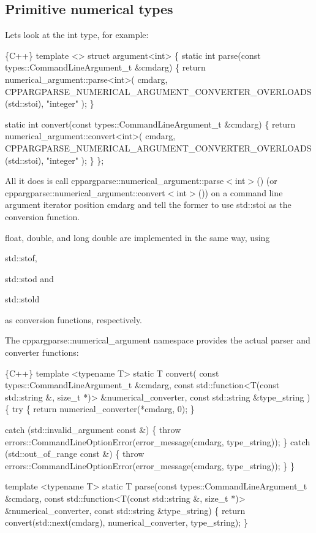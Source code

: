 \subsection*{Primitive numerical types}

Let\textquotesingle{}s look at the {\ttfamily int} type, for example\+: 
\begin{DoxyCode}
\{C++\}
template <>
struct argument<int>
\{
    static int parse(const types::CommandLineArgument\_t &cmdarg)
    \{
        return numerical\_argument::parse<int>(
            cmdarg,
            CPPARGPARSE\_NUMERICAL\_ARGUMENT\_CONVERTER\_OVERLOADS(std::stoi),
            "integer"
        );
    \}

    static int convert(const types::CommandLineArgument\_t &cmdarg)
    \{
        return numerical\_argument::convert<int>(
            cmdarg,
            CPPARGPARSE\_NUMERICAL\_ARGUMENT\_CONVERTER\_OVERLOADS(std::stoi),
            "integer"
        );
    \}
\};
\end{DoxyCode}


All it does is call {\ttfamily cppargparse\+::numerical\+\_\+argument\+::parse$<$int$>$()} (or {\ttfamily cppargparse\+::numerical\+\_\+argument\+::convert$<$int$>$()}) on a command line argument iterator position {\ttfamily cmdarg} and tell the former to use {\ttfamily std\+::stoi} as the conversion function.

{\ttfamily float}, {\ttfamily double}, and {\ttfamily long double} are implemented in the same way, using
\begin{DoxyItemize}
\item {\ttfamily std\+::stof},
\item {\ttfamily std\+::stod} and
\item {\ttfamily std\+::stold}
\end{DoxyItemize}

as conversion functions, respectively.

The {\ttfamily cppargparse\+::numerical\+\_\+argument} namespace provides the actual parser and converter functions\+: 
\begin{DoxyCode}
\{C++\}
template <typename T>
static T convert(
        const types::CommandLineArgument\_t &cmdarg,
        const std::function<T(const std::string &, size\_t *)> &numerical\_converter,
        const std::string &type\_string
    )
\{
    try
    \{
        return numerical\_converter(*cmdarg, 0);
    \}

    catch (std::invalid\_argument const &)
    \{
        throw errors::CommandLineOptionError(error\_message(cmdarg, type\_string));
    \}
    catch (std::out\_of\_range const &)
    \{
        throw errors::CommandLineOptionError(error\_message(cmdarg, type\_string));
    \}
\}

template <typename T>
static T parse(const types::CommandLineArgument\_t &cmdarg,
        const std::function<T(const std::string &, size\_t *)> &numerical\_converter,
        const std::string &type\_string)
\{
    return convert(std::next(cmdarg), numerical\_converter, type\_string);
\}
\end{DoxyCode}


